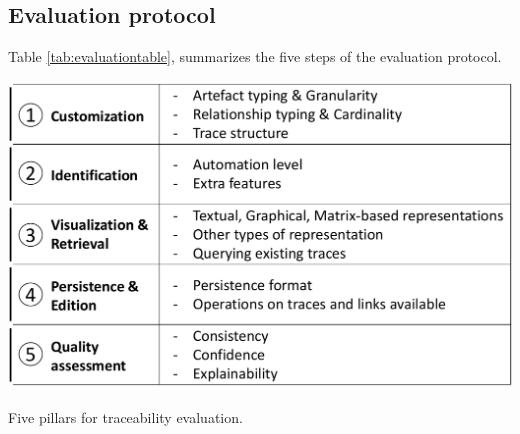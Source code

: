 \subsection{Evaluation protocol}
Table \ref{tab:evaluationtable}, summarizes the five steps of the evaluation protocol.

\begin{table}[h]  
	\centering
	\includegraphics[width=.65\linewidth]{images/evaluation-table.pdf}
	\caption{Five pillars for traceability evaluation.}
	\label{tab:evaluationtable}
\end{table}

